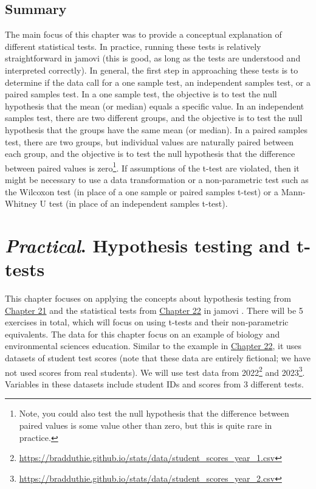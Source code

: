 \documentclass[
  openany]{krantz}
\begin{document}
\hypertarget{summary-3}{%
\section{Summary}\label{summary-3}}

The main focus of this chapter was to provide a conceptual explanation of different statistical tests.
In practice, running these tests is relatively straightforward in jamovi (this is good, as long as the tests are understood and interpreted correctly).
In general, the first step in approaching these tests is to determine if the data call for a one sample test, an independent samples test, or a paired samples test.
In a one sample test, the objective is to test the null hypothesis that the mean (or median) equals a specific value.
In an independent samples test, there are two different groups, and the objective is to test the null hypothesis that the groups have the same mean (or median).
In a paired samples test, there are two groups, but individual values are naturally paired between each group, and the objective is to test the null hypothesis that the difference between paired values is zero\footnote{Note, you could also test the null hypothesis that the difference between paired values is some value other than zero, but this is quite rare in practice.}.
If assumptions of the t-test are violated, then it might be necessary to use a data transformation or a non-parametric test such as the Wilcoxon test (in place of a one sample or paired samples t-test) or a Mann-Whitney U test (in place of an independent samples t-test).

\hypertarget{Chapter_23}{%
\chapter{\texorpdfstring{\emph{Practical}. Hypothesis testing and t-tests}{Practical. Hypothesis testing and t-tests}}\label{Chapter_23}}

This chapter focuses on applying the concepts about hypothesis testing from \protect\hyperlink{Chapter_21}{Chapter 21} and the statistical tests from \protect\hyperlink{Chapter_22}{Chapter 22} in jamovi \citep{Jamovi2022}.
There will be 5 exercises in total, which will focus on using t-tests and their non-parametric equivalents.
The data for this chapter focus on an example of biology and environmental sciences education.
Similar to the example in \protect\hyperlink{Chapter_22}{Chapter 22}, it uses datasets of student test scores (note that these data are entirely fictional; we have not used scores from real students).
We will use test data from 2022\footnote{\url{https://bradduthie.github.io/stats/data/student_scores_year_1.csv}} and 2023\footnote{\url{https://bradduthie.github.io/stats/data/student_scores_year_2.csv}}.
Variables in these datasets include student IDs and scores from 3 different tests.
\end{document}
